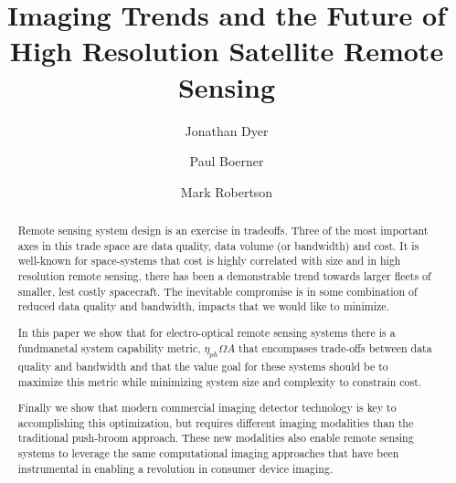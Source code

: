 \documentclass[]{spieman}  %
\title{Imaging Trends and the Future of \\High Resolution Satellite Remote Sensing}
\begin{document}
\newtheorem{mydef}{Definition}
\newtheorem{observation}{Observation}

\makeatletter
\newcommand\footnoteref[1]{\protected@xdef\@thefnmark{\ref{#1}}\@footnotemark}
\makeatother

\author[a]{Jonathan Dyer}
\author[b]{Paul Boerner}
\author[a]{Mark Robertson}
%

\maketitle
        
\begin{abstract}

    Remote sensing system design is an exercise in tradeoffs.  Three of the most important axes in this trade space are data quality, data volume (or bandwidth) and cost.  It is well-known for space-systems that cost is highly correlated with size\cite{bearden} and in high resolution remote sensing, there has been a demonstrable trend towards larger fleets of smaller, lest costly spacecraft.  The inevitable compromise is in some combination of reduced data quality and bandwidth, impacts that we would like to minimize.

    In this paper we show that for electro-optical remote sensing systems there is a fundmanetal system capability metric, $\eta_{ph}\Omega A$ that encompases trade-offs between data quality and bandwidth and that the value goal for these systems should be to maximize this metric while minimizing system size and complexity to constrain cost.  

    Finally we show that modern commercial imaging detector technology is key to accomplishing this optimization, but requires different imaging modalities than the traditional push-broom approach.  These new modalities also enable remote sensing systems to leverage the same computational imaging approaches that have been instrumental in enabling a revolution in consumer device imaging.
\end{abstract}
\end{document}
